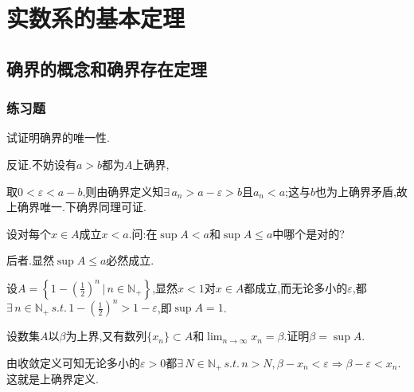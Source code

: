 \documentclass[cn,chinese,fontset]{elegantbook}
\begin{document}
\tableofcontents

    \chapter{实数系的基本定理}
        \section{确界的概念和确界存在定理}
            \subsection{练习题}
            \begin{exercise}
                试证明确界的唯一性.
            \end{exercise}
            \begin{solution}
                反证.不妨设有$a>b$都为$A$上确界,

                取$0<\varepsilon<a-b$,则由确界定义知$\exists\, a_n>a-\varepsilon>b$且$a_n<a$;这与$b$也为上确界矛盾,故上确界唯一.下确界同理可证.
            \end{solution}

            \begin{exercise}
                设对每个$x\in A$成立$x<a$.问:在$\sup A<a$和$\sup A\leqslant a$中哪个是对的?
            \end{exercise}
            
            \begin{solution}
                后者.显然$\sup A\leqslant a$必然成立.

                设$A=\left\{1-(\frac{1}{2})^n\,\bigg\lvert\,n\in \mathbb{N}_+\right\}$,显然$x<1$对$x\in A$都成立,而无论多小的$\varepsilon$,都$\exists\,n\in \mathbb{N}_+\,s.t.\,1-(\frac{1}{2})^n>1-\varepsilon$,即$\sup A=1$.
            \end{solution}

            \begin{exercise}
                设数集$A$以$\beta$为上界,又有数列$\{x_n\}\subset A$和$\lim_{n\to\infty}x_n=\beta.$证明$\beta=\sup A$.
            \end{exercise}
            
            \begin{solution}
                由收敛定义可知无论多小的$\varepsilon>0$都$\exists\,N\in \mathbb{N}_+\,s.t.\,n>N,\beta-x_n<\varepsilon\Rightarrow\beta-\varepsilon<x_n$.这就是上确界定义.
            \end{solution}
\end{document}
